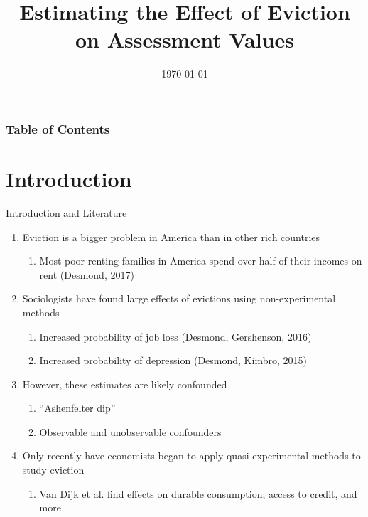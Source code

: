 \documentclass [xcolor=svgnames, t] {beamer}
\title[Eviction and Property Values]{Estimating the Effect of Eviction on Assessment Values}
\institute[]{Department of Earth, Environmental, and Planetary Sciences  \\Brown University}
\author[Arjun Shanmugam]{}
\date{\today}
\begin{document}
\begin{frame}
\maketitle
\end{frame}


\begin{frame}
\frametitle{Table of Contents}
\tableofcontents
\end{frame}

\section{Introduction}
\begin{frame}{Introduction and Literature}
   \begin{enumerate}
       \item Eviction is a bigger problem in America than in other rich countries
       \begin{enumerate}
           \item Most poor renting families in America
spend over half of their incomes on rent (Desmond, 2017)
       \end{enumerate}
       \item Sociologists have found large effects of evictions using non-experimental methods
       \begin{enumerate}
           \item Increased probability of job loss (Desmond, Gershenson, 2016)
           \item Increased probability of depression (Desmond, Kimbro, 2015)
       \end{enumerate} 
       \item However, these estimates are likely confounded
       \begin{enumerate}
           \item ``Ashenfelter dip''
           \item Observable and unobservable confounders
       \end{enumerate}
       \item Only recently have economists began to apply quasi-experimental methods to study eviction
        \begin{enumerate}
            \item Van Dijk et al. find effects on durable consumption, access to credit, and more
        \end{enumerate}
   \end{enumerate}
\end{frame}
\end{document}
